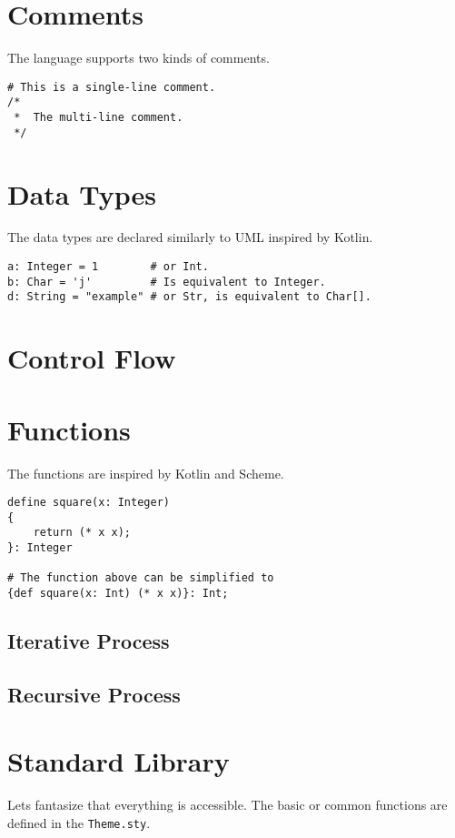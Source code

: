 \documentclass{book}
\begin{document}
\section{Comments}
\begin{example} The language supports two kinds of comments.
\begin{lstlisting}
# This is a single-line comment.
/*
 *  The multi-line comment.
 */
\end{lstlisting}
\end{example}

\section{Data Types}
\begin{example}
The data types are declared similarly to UML inspired by Kotlin.
\begin{lstlisting}
a: Integer = 1        # or Int.
b: Char = 'j'         # Is equivalent to Integer.
d: String = "example" # or Str, is equivalent to Char[].
\end{lstlisting}
\end{example}

\section{Control Flow}

\section{Functions}
\begin{example} The functions are inspired by Kotlin and Scheme.
\begin{lstlisting}
define square(x: Integer)
{
    return (* x x);
}: Integer

# The function above can be simplified to
{def square(x: Int) (* x x)}: Int;
\end{lstlisting}
\end{example}

\subsection{Iterative Process}

\subsection{Recursive Process}

\section{Standard Library}
Lets fantasize that everything is accessible.
The basic or common functions are defined in the \verb|Theme.sty|.
\end{document}
